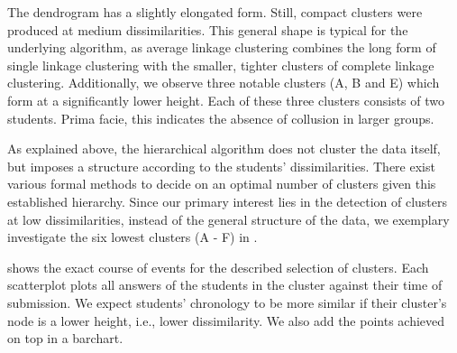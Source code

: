 \documentclass{edm_article}
\begin{document}
The dendrogram has a slightly elongated form. Still, compact clusters were produced at medium dissimilarities. This general shape is typical for the underlying algorithm, as average linkage clustering combines the long form of single linkage clustering with the smaller, tighter clusters of complete linkage clustering. Additionally, we observe three notable clusters (A, B and E) which form at a significantly lower height. Each of these three clusters consists of two students. Prima facie, this indicates the absence of collusion in larger groups.

As explained above, the hierarchical algorithm does not cluster the data itself, but imposes a structure according to the students' dissimilarities. There exist various formal methods to decide on an optimal number of clusters given this established hierarchy. Since our primary interest lies in the detection of clusters at low dissimilarities, instead of the general structure of the data, we exemplary investigate the six lowest clusters (A - F) in .

 shows the exact course of events for the described selection of clusters. Each scatterplot plots all answers of the students in the cluster against their time of submission. We expect students' chronology to be more similar if their cluster's node is a lower height, i.e., lower dissimilarity. We also add the points achieved on top in a barchart.
\end{document}
